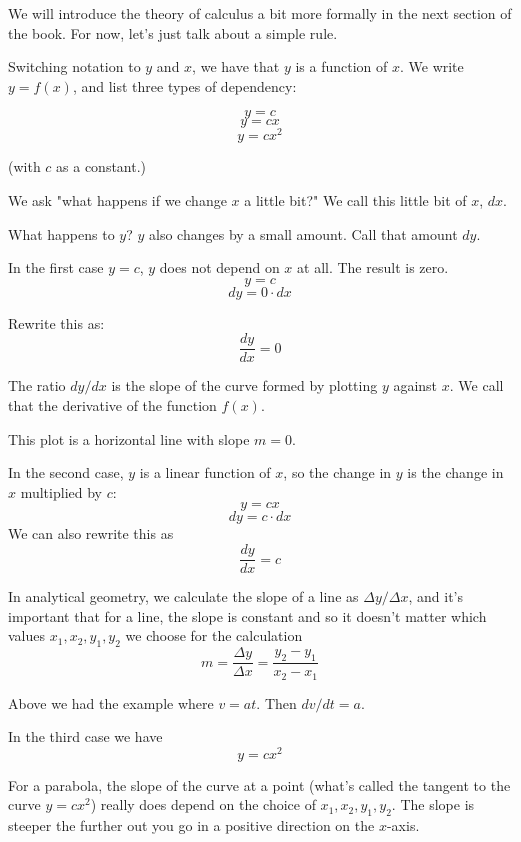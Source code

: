 \documentclass[11pt, oneside]{article}
\begin{document}
We will introduce the theory of calculus a bit more formally in the next section of the book.  For now, let's just talk about a simple rule.

Switching notation to $y$ and $x$, we have that $y$ is a function of $x$.  We write $y = f(x)$, and list three types of dependency:

\[ y = c \]
\[ y = cx \]
\[ y = cx^2 \]

 (with $c$ as a constant.)
 
We ask "what happens if we change $x$ a little bit?"  We call this little bit of $x$, $dx$.  

What happens to $y$?  $y$ also changes by a small amount.  Call that amount $dy$.

In the first case $y = c$, $y$ does not depend on $x$ at all.  The result is zero.
\[ y = c \]
\[ dy = 0 \cdot dx \]

Rewrite this as:
\[ \frac{dy}{dx} = 0 \]

The ratio $dy/dx$ is the slope of the curve formed by plotting $y$ against $x$.  We call that the derivative of the function $f(x)$.

This plot is a horizontal line with slope $m = 0$.

In the second case, $y$ is a linear function of $x$, so the change in $y$ is the change in $x$ multiplied by $c$:
\[ y = cx \]
\[ dy = c \cdot dx \]
We can also rewrite this as 
\[ \frac{dy}{dx} = c \]

In analytical geometry, we calculate the slope of a line as $\Delta y/\Delta x$, and it's important that for a line, the slope is constant and so it doesn't matter which values $x_1,x_2,y_1,y_2$ we choose for the calculation
\[ m = \frac{\Delta y}{\Delta x} = \frac{y_2 - y_1}{x_2 - x_1} \]

Above we had the example where $v = at$.  Then $dv/dt = a$.

In the third case we have
\[ y = cx^2 \]

For a parabola, the slope of the curve at a point (what's called the tangent to the curve $y = cx^2$) really does depend on the choice of $x_1,x_2,y_1,y_2$.  The slope is steeper the further out you go in a positive direction on the $x$-axis.
\end{document}

